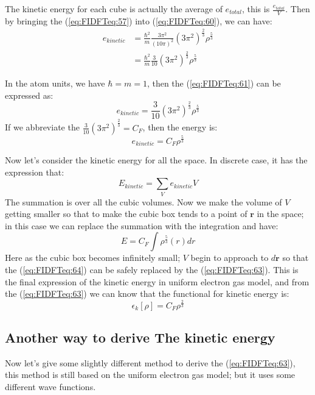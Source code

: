 The kinetic energy for each cube is actually the average of
$e_{total}$, this is $\frac{e_{total}}{V}$. Then by bringing the
(\ref{eq:FIDFTeq:57}) into (\ref{eq:FIDFTeq:60}), we can have:
\begin{align}
  \label{eq:FIDFTeq:61}
e_{kinetic} &= \frac{\hbar^{2}}{m}
\frac{3\pi^{2}}{(10\pi)^{2}}(3\pi^{2})^{\frac{2}{3}}\rho^{\frac{5}{3}}
\nonumber \\
&= \frac{\hbar^{2}}{m}
\frac{3}{10}(3\pi^{2})^{\frac{2}{3}}\rho^{\frac{5}{3}}
\end{align}

In the atom units, we have $\hbar = m = 1$, then the
(\ref{eq:FIDFTeq:61}) can be expressed as:
\begin{equation}
  \label{eq:FIDFTeq:62}
e_{kinetic} = \frac{3}{10}(3\pi^{2})^{\frac{2}{3}}\rho^{\frac{5}{3}}
\end{equation}
If we abbreviate the $\frac{3}{10}(3\pi^{2})^{\frac{2}{3}} = C_{F}$,
then the energy is:
\begin{equation}
  e_{kinetic} = C_{F}\rho^{\frac{5}{3}}
\end{equation}

Now let's consider the kinetic energy for all the space. In discrete
case, it has the expression that:
\begin{equation}
\label{eq:FIDFTeq:64}
E_{kinetic} = \sum_{V}e_{kinetic}V
\end{equation}
The summation is over all the cubic volumes. Now we make the volume of
$V$ getting smaller so that to make the cubic box tends to a point of
$\mathbf{r}$ in the space; in this case we can replace the summation
with the integration and have:
\begin{equation}
  \label{eq:FIDFTeq:63}
E = C_{F}\int\rho^{\frac{5}{3}}(r)dr
\end{equation}
Here as the cubic box becomes infinitely small; $V$ begin to approach
to $d\mathbf{r}$ so that the (\ref{eq:FIDFTeq:64}) can be safely
replaced by the (\ref{eq:FIDFTeq:63}). This is the final expression of
the kinetic energy in uniform electron gas model, and from the
(\ref{eq:FIDFTeq:63}) we can know that the functional for kinetic
energy is:
\begin{equation}
  \label{eq:FIDFTeq:65}
  \epsilon_{k}[\rho] = C_{F}\rho^{\frac{2}{3}}
\end{equation}


\subsection{Another way to derive The kinetic energy}
%
%
%
%
Now let's give some slightly different method to derive the
(\ref{eq:FIDFTeq:63}), this method is still based on the uniform
electron gas model; but it uses some different wave
functions\cite{weitaoYang}.


